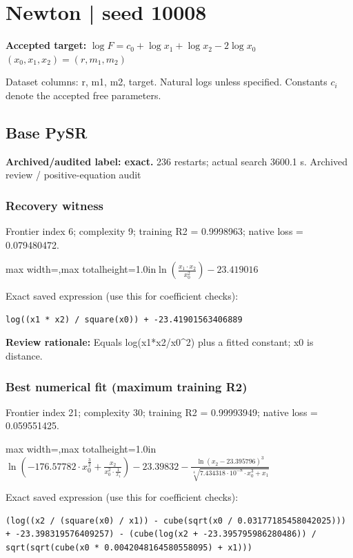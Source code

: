 \documentclass[10pt,letterpaper,landscape]{article}
\begin{document}
\section*{Newton | seed 10008}
\textbf{Accepted target:} $\displaystyle \log F=c_0+\log x_1+\log x_2-2\log x_0$\hfill $(x_0,x_1,x_2)=(r,m_1,m_2)$\par
{\small Dataset columns: r, m1, m2, target. Natural logs unless specified. Constants $c_i$ denote the accepted free parameters.}\par\medskip
\begin{minipage}[t]{0.485\textwidth}
\subsection*{Base PySR}
\textbf{Archived/audited label: exact.} 236 restarts; actual search 3600.1 s.
{\small Archived review / positive-equation audit}
\subsubsection*{Recovery witness}
Frontier index 6; complexity 9; training R2 = 0.9998963; native loss = 0.079480472.
\begin{center}\begin{adjustbox}{max width=\linewidth,max totalheight=1.0in}$\displaystyle \ln{\left(\frac{x_{1} \cdot x_{2}}{x_{0}^{2}} \right)} - 23.419016$\end{adjustbox}\end{center}
{\scriptsize Exact saved expression (use this for coefficient checks):}
\begin{lstlisting}
log((x1 * x2) / square(x0)) + -23.41901563406889
\end{lstlisting}
{\small\textbf{Review rationale:} Equals log(x1*x2/x0\textasciicircum{}2) plus a fitted constant; x0 is distance.}
\subsubsection*{Best numerical fit (maximum training R2)}
Frontier index 21; complexity 30; training R2 = 0.99993949; native loss = 0.059551425.
\begin{center}\begin{adjustbox}{max width=\linewidth,max totalheight=1.0in}$\displaystyle \ln{\left(- 176.57782 \cdot x_{0}^{\frac{3}{2}} + \frac{x_{2}}{x_{0}^{2} \cdot \frac{1}{x_{1}}} \right)} - 23.39832 - \frac{\ln{\left(x_{2} - 23.395796 \right)}^{3}}{\sqrt[4]{7.434318 \cdot 10^{-8} \cdot x_{0}^{3} + x_{1}}}$\end{adjustbox}\end{center}
{\scriptsize Exact saved expression (use this for coefficient checks):}
\begin{lstlisting}
(log((x2 / (square(x0) / x1)) - cube(sqrt(x0 / 0.03177185458042025))) + -23.398319576409257) - (cube(log(x2 + -23.395795986280486)) / sqrt(sqrt(cube(x0 * 0.0042048164580558095) + x1)))
\end{lstlisting}
\end{minipage}\hfill
\end{document}
